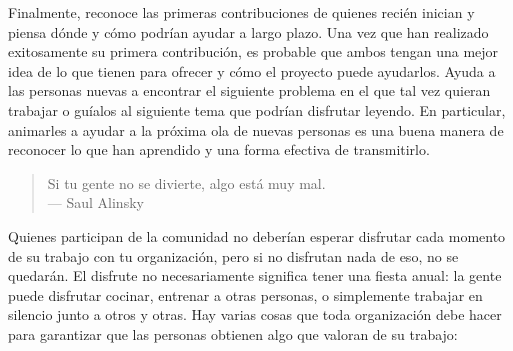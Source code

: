 Finalmente,
reconoce las primeras contribuciones de quienes recién inician
y piensa dónde y cómo podrían ayudar a largo plazo.
Una vez que han realizado exitosamente su primera contribución,
es probable que ambos tengan una mejor idea de lo que tienen para ofrecer
y cómo el proyecto puede ayudarlos.
Ayuda a las personas nuevas a encontrar el siguiente problema en el que tal vez quieran trabajar
o guíalos al siguiente tema que podrían disfrutar leyendo.
En particular,
animarles a ayudar a la próxima ola de nuevas personas
es una buena manera de reconocer lo que han aprendido
y una forma efectiva de transmitirlo.


\begin{quote}

 Si tu gente no se divierte, algo está muy mal.\\
  --- Saul Alinsky

\end{quote}

Quienes participan de la comunidad no deberían esperar disfrutar cada momento de su trabajo con tu organización,
pero si no disfrutan nada de eso,
no se quedarán.
El disfrute no necesariamente significa tener una fiesta anual:
la gente puede disfrutar cocinar,
entrenar a otras personas,
o simplemente trabajar en silencio junto a otros y otras.
Hay varias cosas que toda organización debe hacer para garantizar
que las personas obtienen algo que valoran de su trabajo:

